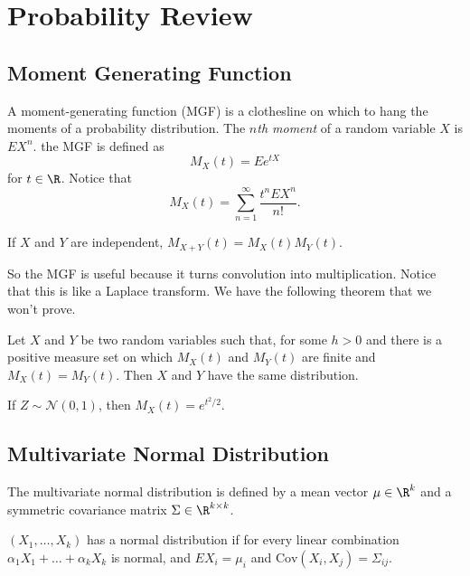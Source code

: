 \chapter{Probability Review}
\section{Moment Generating Function}
A {moment-generating function (MGF)} is a clothesline on which to hang the moments of a probability distribution. The {\it $n$th moment} of a random variable $X$ is $EX^n$. the MGF is defined as 
\[M_X(t) = Ee^{tX}\]
for $t\in\R$. Notice that 
\[M_X(t) = \sum_{n=1}^\infty \frac{t^nEX^n}{n!}. \]
\begin{prop}
    If $X$ and $Y$ are independent, $M_{X+Y}(t) = M_X(t)M_Y(t)$. 
\end{prop}
So the MGF is useful because it turns convolution into multiplication. Notice that this is like a Laplace transform. We have the following theorem that we won't prove. 
\begin{thm}
    Let $X$ and $Y$ be two random variables such that, for some $h>0$ and there is a positive measure set on which $M_X(t)$ and $M_Y(t)$ are finite and $M_X(t)=M_Y(t)$. Then $X$ and $Y$ have the same distribution. 
\end{thm}
If $Z\sim\mathcal{N}(0, 1)$, then $M_X(t)=e^{t^2/2}$. 

\section{Multivariate Normal Distribution}
The multivariate normal distribution is defined by a mean vector $\mu\in\R^k$ and a symmetric covariance matrix $\Sigma\in\R^{k\times k}$. 
\begin{defn}
    $(X_1, \dots, X_k)$ has a normal distribution if for every linear combination $\alpha_1X_1 + \dots + \alpha_kX_k$ is normal, 
    and $EX_i = \mu_i$ and $\mathrm{Cov}(X_i, X_j) = \Sigma_{ij}$. 
\end{defn}


